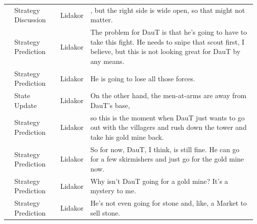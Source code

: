{\begin{longtable}{@{}>{\theAppRow}r|L{2.3cm}L{1.0cm}U{11.55cm}@{}}
    & Strategy Discussion   & Lidakor & , but the right side is wide open, so that might not matter.                                                                                                                                                                                                                                    \\
    & Strategy Prediction   & Lidakor & The problem for DauT is that he's going to have to take this fight. He needs to snipe that scout first, I believe, but this is not looking great for DauT by any means.                                                                                                                         \\
    & Strategy Prediction   & Lidakor & He is going to lose all those forces.                                                                                                                                                                                                                                                           \\
    & State Update          & Lidakor & On the other hand, the men-at-arms are away from DauT's base,                                                                                                                                                                                                                                   \\
    & Strategy Prediction   & Lidakor & so this is the moment when DauT just wants to go out with the villagers and rush down the tower and take his gold mine back.                                                                                                                                                                    \\
    & Strategy Prediction   & Lidakor & So for now, DauT, I think, is still fine. He can go for a few skirmishers and just go for the gold mine now.                                                                                                                                                                                    \\
    & Strategy Prediction   & Lidakor & Why isn't DauT going for a gold mine? It's a mystery to me.                                                                                                                                                                                                                                     \\
    & Strategy Prediction   & Lidakor & He's not even going for stone and, like, a Market to sell stone.                                                                                                                                                                                                                                \\

\end{longtable}}
